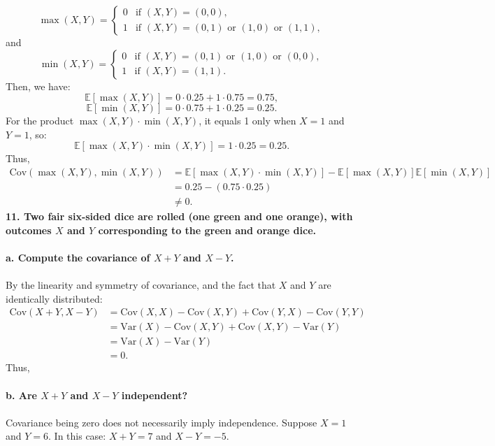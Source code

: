 \documentclass[a4paper,11pt]{article}
\begin{document}
\[
\max(X, Y) = \begin{cases}
0 & \text{if } (X, Y) = (0, 0), \\
1 & \text{if } (X, Y) = (0, 1) \text{ or } (1, 0) \text{ or } (1, 1),
\end{cases}
\]
and
\[
\min(X, Y) = \begin{cases}
0 & \text{if } (X, Y) = (0, 1) \text{ or } (1, 0) \text{ or } (0, 0), \\
1 & \text{if } (X, Y) = (1, 1).
\end{cases}
\]
Then, we have:
\[
\mathbb{E}[\max(X, Y)] = 0 \cdot 0.25 + 1 \cdot 0.75 = 0.75,
\]
\[
\mathbb{E}[\min(X, Y)] = 0 \cdot 0.75 + 1 \cdot 0.25 = 0.25.
\]
For the product \(\max(X, Y) \cdot \min(X, Y)\), it equals 1 only when \(X = 1\) and \(Y = 1\), so:
\[
\mathbb{E}[\max(X, Y) \cdot \min(X, Y)] = 1 \cdot 0.25 = 0.25.
\]
Thus,
\begin{align*}
    \text{Cov}(\max(X, Y), \min(X, Y)) &= \mathbb{E}[\max(X, Y) \cdot \min(X, Y)] - \mathbb{E}[\max(X, Y)] \mathbb{E}[\min(X, Y)] \\
    &= 0.25 - (0.75 \cdot 0.25) \\
    &\neq 0.
\end{align*}
\textbf{11. Two fair six-sided dice are rolled (one green and one orange), with outcomes \(X\) and \(Y\) corresponding to the green and orange dice.}
\\ \\
\textbf{a. Compute the covariance of \(X + Y\) and \(X - Y\).}
\\ \\
By the linearity and symmetry of covariance, and the fact that $X$ and $Y$ are identically distributed:
\begin{align*}
    \text{Cov}(X + Y, X - Y) &= \text{Cov}(X, X) - \text{Cov}(X, Y) + \text{Cov}(Y, X) - \text{Cov}(Y, Y) \\
    &= \text{Var}(X) - \text{Cov}(X, Y) + \text{Cov}(X, Y) - \text{Var}(Y) \\
    &= \text{Var}(X) - \text{Var}(Y) \\
    &= 0.
\end{align*}
Thus, 
\\ \\
\textbf{b. Are \(X + Y\) and \(X - Y\) independent?}
\\ \\
Covariance being zero does not necessarily imply independence. Suppose \(X = 1\) and \(Y = 6\). In this case:
\(X + Y = 7\) and \(X - Y = -5\).
\end{document}
